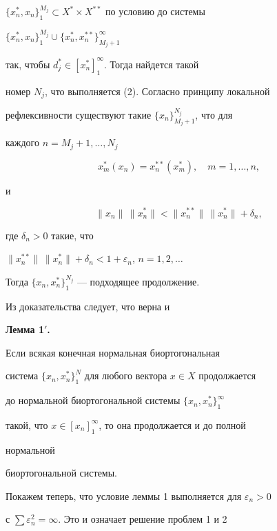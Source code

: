 \begin{pf}
$\{x^*_n,x_n\}^{M_j}_1\subset X^*\times X^{**}$ по условию до системы 


$\{x^*_n,x_n\}^{M_j}_1\cup\{x^*_n,x^{**}_n\}^\infty_{M_j+1}$ 


так, чтобы $d^*_j\in[x^*_n]^\infty_1$. Тогда найдется такой 


номер $N_j$, что выполняется (2). Согласно принципу локальной 


рефлексивности существуют такие $\{x_n\}^{N_j}_{M_j+1}$, что для 


каждого $n=M_j+1,\dotsc,N_j$ 


$$ 


x^*_m(x_n)=x^{**}_n(x^*_m),\quad m=1,\dotsc,n, 


$$ 


и 


$$ 


\|x_n\|\,\|x^*_n\|<\|x^{**}_n\|\,\|x^*_n\|+\delta_n, 


$$ 


где $\delta_n>0$ такие, что 


$\|x^{**}_n\|\,\|x^*_n\|+\delta_n<1+\varepsilon_n$, $n=1,2,\dotsc$ 


Тогда $\{x_n,x^*_n\}^{N_j}_1$ --- подходящее продолжение. 


\end{pf} 


 


Из доказательства следует, что верна и 


\medskip 


 


{\bf Лемма 1$'$.} {\it 


Если всякая конечная нормальная биортогональная 


система $\{x_n,x^*_n\}^N_1$ для любого вектора $x\in X$ продолжается 


до нормальной биортогональной системы $\{x_n,x^*_n\}^\infty_1$ 


такой, что $x\in[x_n]^\infty_1$, то она продолжается и до полной 


нормальной 


биортогональной системы. 


} 


\medskip 


 


Покажем теперь, что условие леммы 1 выполняется для $\varepsilon_n>0$ 


с $\sum\varepsilon^2_n=\infty$. Это и означает решение проблем 1 и 2 


